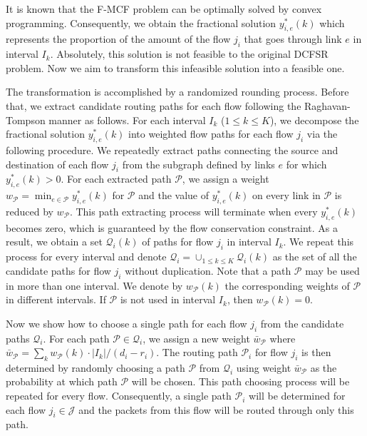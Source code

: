 \documentclass[10pt, conference, compsocconf]{IEEEtran}
\begin{document}
It is known that the F-MCF problem can be optimally solved by convex programming. Consequently, we obtain the fractional solution $y^*_{i,e}(k)$ which represents the proportion of the amount of the flow $j_i$ that goes through link $e$ in interval $I_k$. Absolutely, this solution is not feasible to the original DCFSR problem. Now we aim to transform this infeasible solution into a feasible one.

The transformation is accomplished by a randomized rounding process. Before that, we extract candidate routing paths for each flow following the Raghavan-Tompson \cite{Raghavan_Tompson} manner as follows. For each interval $I_k$ ($1\leq k \leq K$), we decompose the fractional solution $y^*_{i,e}(k)$ into weighted flow paths for each flow $j_i$ via the following procedure. We repeatedly extract paths connecting the source and destination of each flow $j_i$ from the subgraph defined by links $e$ for which $y^*_{i,e}(k) > 0$. For each extracted path $\mathcal{P}$, we assign a weight $w_\mathcal{P} = \min_{e \in \mathcal{P}} y^*_{i,e}(k)$ for $\mathcal{P}$ and the value of $y^*_{i,e}(k)$ on every link in $\mathcal{P}$ is reduced by $w_\mathcal{P}$. This path extracting process will terminate when every $y^*_{i,e}(k)$ becomes zero, which is guaranteed by the flow conservation constraint. As a result, we obtain a set $\mathcal{Q}_i(k)$ of paths for flow $j_i$ in interval $I_k$. We repeat this process for every interval and denote $\mathcal{Q}_i = \cup_{1\leq k\leq K} \mathcal{Q}_i(k)$ as the set of all the candidate paths for flow $j_i$ without duplication. Note that a path $\mathcal{P}$ may be used in more than one interval. We denote by $w_\mathcal{P}(k)$ the corresponding weights of $\mathcal{P}$ in different intervals. If $\mathcal{P}$ is not used in interval $I_k$, then $w_\mathcal{P}(k) = 0$.

Now we show how to choose a single path for each flow $j_i$ from the candidate paths $\mathcal{Q}_i$. For each path $\mathcal{P} \in \mathcal{Q}_i$, we assign a new weight $\bar{w}_\mathcal{P}$ where $\bar{w}_\mathcal{P} = \sum_k w_\mathcal{P}(k) \cdot |I_k|/(d_i-r_i)$. The routing path $\mathcal{P}_i$ for flow $j_i$ is then determined by randomly choosing a path $\mathcal{P}$ from $\mathcal{Q}_i$ using weight $\bar{w}_\mathcal{P}$ as the probability at which path $\mathcal{P}$ will be chosen. This path choosing process will be repeated for every flow. Consequently, a single path $\mathcal{P}_i$ will be determined for each flow $j_i \in \mathcal{J}$ and the packets from this flow will be routed through only this path.
\end{document}
